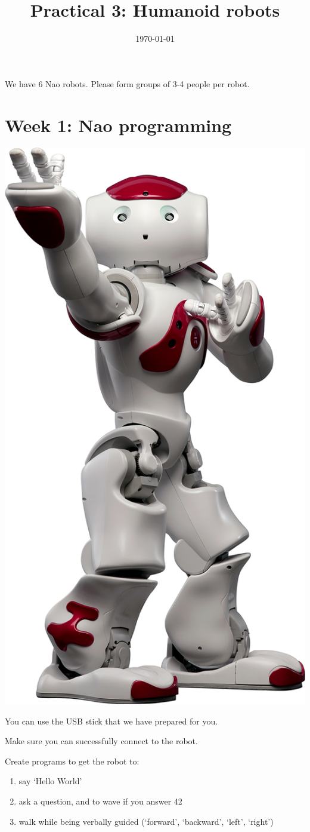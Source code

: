 \documentclass{instructions}
\title{Practical 3: Humanoid robots}
\date{\today}
\begin{document}
\maketitle





\intro

We have 6 Nao robots. Please form groups of 3-4 people per robot.

\part{Week 1: Nao programming}

\begin{center}
    \includegraphics[width=0.3\linewidth]{figs/nao}
\end{center}


You can use the USB stick that we have prepared for you.

Make sure you can successfully connect to the robot.


Create programs to get the robot to:

\begin{enumerate}
    \item say ‘Hello World’
    \item ask a question, and to wave if you answer 42
    \item walk while being verbally guided (‘forward’, ‘backward’, ‘left’, ‘right’)
\end{enumerate}
\end{document}
